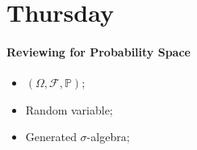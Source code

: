 \section{Thursday}
\paragraph{Reviewing for Probability Space}
\begin{itemize}
\item
$(\Omega,\mathcal{F},\mathbb{P})$;
\item
Random variable;
\item
Generated $\sigma$-algebra;
\end{itemize}



